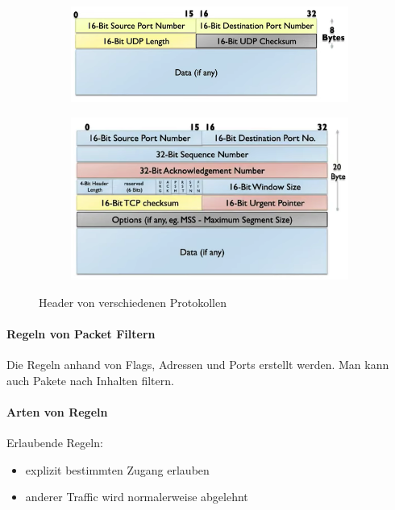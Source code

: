 \begin{figure}[h]
  \begin{subfigure}[c]{0.45\textwidth}
    \centering
    \includegraphics[width=1.0\linewidth]{bilder/udp_header.png}
    \label{fig:udp_header}
  \end{subfigure}
  \begin{subfigure}[c]{0.45\textwidth}
    \centering
    \includegraphics[width=1.0\linewidth]{bilder/tcp_header.png}
    \label{fig:tcp_header}
  \end{subfigure}
  \caption{Header von verschiedenen Protokollen}
\end{figure}

\paragraph{Regeln von Packet Filtern}%
\label{par:regeln_von_packet_filtern}

Die Regeln anhand von Flags, Adressen und Ports erstellt werden.
Man kann auch Pakete nach Inhalten filtern.

\paragraph{Arten von Regeln}%
\label{par:arten_von_regeln}

Erlaubende Regeln:
\begin{itemize}
  \item explizit bestimmten Zugang erlauben
  \item anderer Traffic wird normalerweise abgelehnt
\end{itemize}

